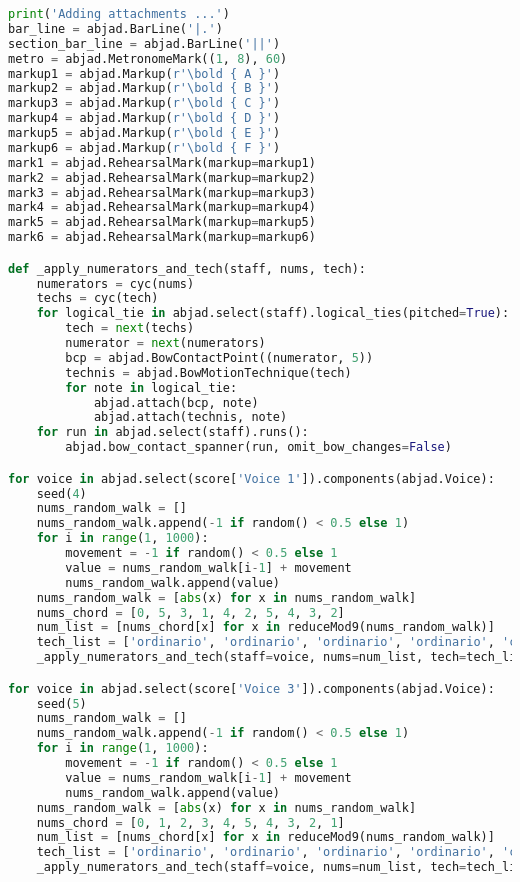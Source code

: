 \begin{lstlisting}[language=Python, caption=Cthar Segment\_I]
print('Adding attachments ...')
bar_line = abjad.BarLine('|.')
section_bar_line = abjad.BarLine('||')
metro = abjad.MetronomeMark((1, 8), 60)
markup1 = abjad.Markup(r'\bold { A }')
markup2 = abjad.Markup(r'\bold { B }')
markup3 = abjad.Markup(r'\bold { C }')
markup4 = abjad.Markup(r'\bold { D }')
markup5 = abjad.Markup(r'\bold { E }')
markup6 = abjad.Markup(r'\bold { F }')
mark1 = abjad.RehearsalMark(markup=markup1)
mark2 = abjad.RehearsalMark(markup=markup2)
mark3 = abjad.RehearsalMark(markup=markup3)
mark4 = abjad.RehearsalMark(markup=markup4)
mark5 = abjad.RehearsalMark(markup=markup5)
mark6 = abjad.RehearsalMark(markup=markup6)

def _apply_numerators_and_tech(staff, nums, tech):
    numerators = cyc(nums)
    techs = cyc(tech)
    for logical_tie in abjad.select(staff).logical_ties(pitched=True):
        tech = next(techs)
        numerator = next(numerators)
        bcp = abjad.BowContactPoint((numerator, 5))
        technis = abjad.BowMotionTechnique(tech)
        for note in logical_tie:
            abjad.attach(bcp, note)
            abjad.attach(technis, note)
    for run in abjad.select(staff).runs():
        abjad.bow_contact_spanner(run, omit_bow_changes=False)

for voice in abjad.select(score['Voice 1']).components(abjad.Voice):
    seed(4)
    nums_random_walk = []
    nums_random_walk.append(-1 if random() < 0.5 else 1)
    for i in range(1, 1000):
        movement = -1 if random() < 0.5 else 1
        value = nums_random_walk[i-1] + movement
        nums_random_walk.append(value)
    nums_random_walk = [abs(x) for x in nums_random_walk]
    nums_chord = [0, 5, 3, 1, 4, 2, 5, 4, 3, 2]
    num_list = [nums_chord[x] for x in reduceMod9(nums_random_walk)]
    tech_list = ['ordinario', 'ordinario', 'ordinario', 'ordinario', 'circular', 'circular', 'ordinario', 'ordinario', 'ordinario', 'jete',  'ordinario', 'ordinario', 'ordinario', 'ordinario', 'ordinario', 'jete', 'jete', 'jete', 'jete',]
    _apply_numerators_and_tech(staff=voice, nums=num_list, tech=tech_list)

for voice in abjad.select(score['Voice 3']).components(abjad.Voice):
    seed(5)
    nums_random_walk = []
    nums_random_walk.append(-1 if random() < 0.5 else 1)
    for i in range(1, 1000):
        movement = -1 if random() < 0.5 else 1
        value = nums_random_walk[i-1] + movement
        nums_random_walk.append(value)
    nums_random_walk = [abs(x) for x in nums_random_walk]
    nums_chord = [0, 1, 2, 3, 4, 5, 4, 3, 2, 1]
    num_list = [nums_chord[x] for x in reduceMod9(nums_random_walk)]
    tech_list = ['ordinario', 'ordinario', 'ordinario', 'ordinario', 'circular', 'circular', 'ordinario', 'ordinario', 'ordinario', 'jete',  'ordinario', 'ordinario', 'ordinario', 'ordinario', 'ordinario', 'jete', 'jete', 'jete', 'jete',]
    _apply_numerators_and_tech(staff=voice, nums=num_list, tech=tech_list)


\end{lstlisting}
